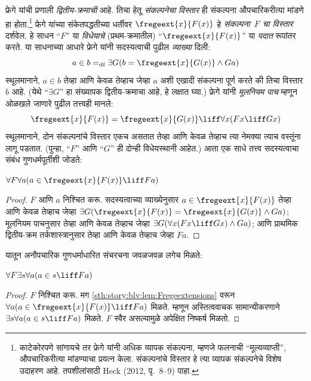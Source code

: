 फ्रेगे यांची प्रणाली \emph{द्वितीय-क्रमाची} आहे. तिचा हेतू \emph{संकल्पनेचा विस्तार} ही संकल्पना औपचारिकरीत्या मांडणे हा होता.\footnote{काटेकोरपणे सांगायचे तर फ्रेगे यांनी अधिक व्यापक संकल्पना, म्हणजे फलनाची ``मूल्यव्याप्ती'', औपचारिकरीत्या मांडण्याचा प्रयत्न केला. संकल्पनांचे विस्तार हे त्या व्यापक संकल्पनेचे विशेष उदाहरण आहे. तपशीलांसाठी Heck (2012, पृ.~8--9) पाहा.} फ्रेगे यांच्या संकेतपद्धतीच्या धर्तीवर $\fregeext{x}{F(x)}$ हे \emph{संकल्पना~$F$ चा विस्तार} दर्शवेल. हे साधन ``$F$'' या \emph{विधेयाचे} (प्रथम-क्रमातील) ``$\fregeext{x}{F(x)}$'' या \emph{पदात} रूपांतर करते. या साधनाच्या आधारे फ्रेगे यांनी सदस्यत्वाची पुढील \emph{व्याख्या} दिली:
\[
	a \in b =_\text{df} \exists G(b = \fregeext{x}{G(x)} \land Ga)
\]
स्थूलमानाने, $a \in b$ तेव्हा आणि केवळ तेव्हाच जेव्हा $a$ अशी एखादी संकल्पना पूर्ण करते की तिचा विस्तार $b$ आहे. (येथे ``$\exists G$'' हा संख्यापक द्वितीय-क्रमाचा आहे, हे लक्षात घ्या.) फ्रेगे यांनी \emph{मूलनियम पाच} म्हणून ओळखले जाणारे पुढील तत्त्वही मानले:
$$\fregeext{x}{F(x)} = \fregeext{x}{G(x)} \liff \forall x (Fx \liff Gx)$$
स्थूलमानाने, दोन संकल्पनांचे विस्तार एकच असतात तेव्हा आणि केवळ तेव्हाच त्या नेमक्या त्याच वस्तूंना लागू पडतात. (पुन्हा, ``$F$'' आणि ``$G$'' ही दोन्ही विधेयस्थानी आहेत.) आता एक साधे तत्त्व सदस्यत्वाचा संबंध गुणधर्मपूर्तीशी जोडते:

\begin{lem}\label{sth:story:blv:lem:Fregeextensions}
$\forall F \forall a(a \in \fregeext{x}{F(x)} \liff Fa)$
\end{lem}

\begin{proof}
$F$ आणि $a$ निश्चित करू. सदस्यत्वाच्या व्याख्येनुसार $a \in \fregeext{x}{F(x)}$ तेव्हा आणि केवळ तेव्हाच जेव्हा $\exists G(\fregeext{x}{F(x)}
= \fregeext{x}{G(x)} \land Ga)$; मूलनियम पाचनुसार तेव्हा आणि केवळ तेव्हाच जेव्हा $\exists G(\forall x(Fx \liff Gx) \land Ga)$; आणि प्राथमिक द्वितीय-क्रम तर्कशास्त्रानुसार तेव्हा आणि केवळ तेव्हाच जेव्हा $Fa$.
\end{proof}

यातून अनौपचारिक गुणधर्माधारित संचरचना जवळजवळ लगेच मिळते:

\begin{lem}
$\forall F \exists s \forall a (a \in s \liff Fa)$
\end{lem}

\begin{proof}
$F$ निश्चित करू. मग \ref{sth:story:blv:lem:Fregeextensions} वरून $\forall a (a \in
\fregeext{x}{F(x)} \liff Fa)$ मिळते. म्हणून अस्तित्ववाचक सामान्यीकरणाने $\exists s\forall a(a \in s \liff Fa)$ मिळते. $F$ स्वैर असल्यामुळे अपेक्षित निष्कर्ष मिळतो.
\end{proof}

